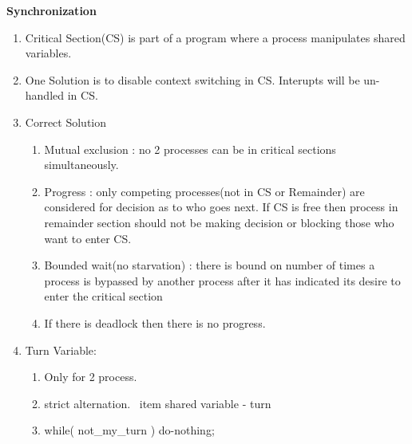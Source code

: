 
\centerline{\textbf{ \LARGE Synchronization}}




\begin{enumerate}

  \item Critical Section(CS) is part of a program where a process manipulates shared variables.
  \item One Solution is to disable context switching in CS. Interupts will be un-handled in CS.
  \item Correct Solution
  \begin{enumerate}
    \item Mutual exclusion : no 2 processes can be in critical sections simultaneously.
    \item Progress : only competing processes(not in CS or Remainder) are considered for decision as to who goes next.
          If CS is free then process in remainder section should not be making decision or blocking those who want to enter CS.
    \item Bounded wait(no starvation) : there is bound on number of times a process is bypassed by another process after
          it has indicated its desire to enter the critical section
    \item If there is deadlock then there is no progress.
  \end{enumerate}

  \item Turn Variable:
  \begin{enumerate}
    \item Only for 2 process.
    \item strict alternation.
    \ item shared variable - turn
    \item while( not\_my\_turn ) do-nothing;
  \end{enumerate}
      \begin{myTableStyle}
        \begin{tabular}{ |m{5cm}|m{5cm}| } \hline
               &        \\ \hline
        \end{tabular}
      \end{myTableStyle}
      \vspace{0.08in}


\end{enumerate}
